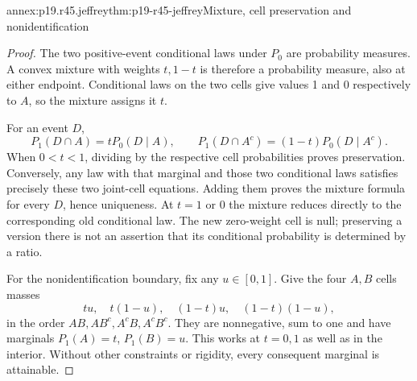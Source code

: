 \begin{annexitem}{annex:p19.r45.jeffrey}{thm:p19-r45-jeffrey}{Mixture, cell preservation and nonidentification}
\begin{proof}
The two positive-event conditional laws under \(P_0\) are probability
measures. A convex mixture with weights \(t,1-t\) is therefore a
probability measure, also at either endpoint. Conditional laws on the
two cells give values 1 and 0 respectively to \(A\), so the mixture
assigns it \(t\).

For an event \(D\),
\[
 P_1(D\cap A)=tP_0(D\mid A),\qquad
 P_1(D\cap A^c)=(1-t)P_0(D\mid A^c).
\]
When \(0<t<1\), dividing by the respective cell probabilities
proves preservation. Conversely, any law with that marginal and those
two conditional laws satisfies precisely these two joint-cell equations.
Adding them proves the mixture formula for every \(D\), hence
uniqueness. At \(t=1\) or 0 the mixture reduces directly to the
corresponding old conditional law. The new zero-weight cell is null;
preserving a version there is not an assertion that its conditional
probability is determined by a ratio.

For the nonidentification boundary, fix any \(u\in[0,1]\).
Give the four \(A,B\) cells masses
\[
 tu,\quad t(1-u),\quad (1-t)u,\quad (1-t)(1-u),
\]
in the order \(AB,AB^c,A^cB,A^cB^c\). They are nonnegative,
sum to one and have marginals \(P_1(A)=t\), \(P_1(B)=u\).
This works at \(t=0,1\) as well as in the interior. Without other
constraints or rigidity, every consequent marginal is attainable.
\end{proof}
\end{annexitem}

